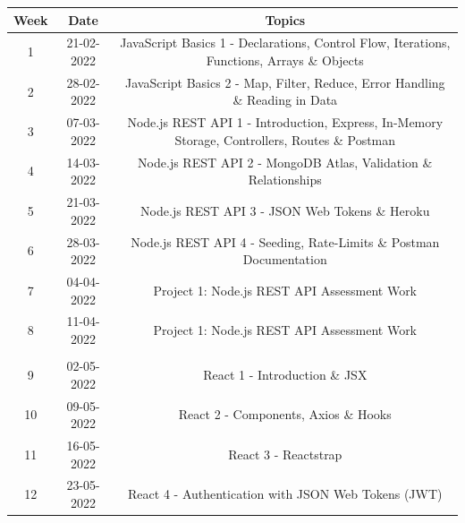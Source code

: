 \documentclass{article}
\begin{document}
\renewcommand{\arraystretch}{1.5}
\begin{tabular}{|c|c|c|c|}
	\hline
	\textbf{Week} & \textbf{Date}     & \multicolumn{2}{c|}{\textbf{Topics}}        \\ \hline
	\footnotesize 1      & \footnotesize 21-02-2022 & \multicolumn{2}{c|}{\footnotesize JavaScript Basics 1 - Declarations, Control Flow, Iterations, Functions, Arrays \& Objects} \\ \hline
	\footnotesize 2      & \footnotesize 28-02-2022 & \multicolumn{2}{c|}{\footnotesize JavaScript Basics 2 - Map, Filter, Reduce, Error Handling \& Reading in Data} \\ \hline
	\footnotesize 3      & \footnotesize 07-03-2022 & \multicolumn{2}{c|}{\footnotesize Node.js REST API 1 - Introduction, Express, In-Memory Storage, Controllers, Routes \& Postman} \\ \hline
	\footnotesize 4      & \footnotesize 14-03-2022 & \multicolumn{2}{c|}{\footnotesize Node.js REST API 2 - MongoDB Atlas, Validation \& Relationships} \\ \hline
	\footnotesize 5      & \footnotesize 21-03-2022 & \multicolumn{2}{c|}{\footnotesize Node.js REST API 3 - JSON Web Tokens \& Heroku } \\ \hline
	\footnotesize 6      & \footnotesize 28-03-2022 & \multicolumn{2}{c|}{\footnotesize Node.js REST API 4 -  Seeding, Rate-Limits \& Postman Documentation} \\ \hline
	\footnotesize 7      & \footnotesize 04-04-2022 & \multicolumn{2}{c|}{\footnotesize Project 1: Node.js REST API Assessment Work} \\ \hline
	\footnotesize 8      & \footnotesize 11-04-2022 & \multicolumn{2}{c|}{\footnotesize Project 1: Node.js REST API Assessment Work} \\ \hline
	\rowcolor{yellow} \multicolumn{4}{|c|}{\footnotesize Mid Term Break}                    \\ \hline
	\footnotesize 9      & \footnotesize 02-05-2022 & \multicolumn{2}{c|}{\footnotesize React 1 - Introduction \& JSX} \\ \hline
	\footnotesize 10     & \footnotesize 09-05-2022 & \multicolumn{2}{c|}{\footnotesize React 2 - Components, Axios \& Hooks} \\ \hline
	\footnotesize 11     & \footnotesize 16-05-2022 & \multicolumn{2}{c|}{\footnotesize React 3 - Reactstrap}     \\ \hline
	\footnotesize 12     & \footnotesize 23-05-2022 & \multicolumn{2}{c|}{\footnotesize React 4 - Authentication with JSON Web Tokens (JWT)}    \\ \hline

\end{tabular}
\end{document}
